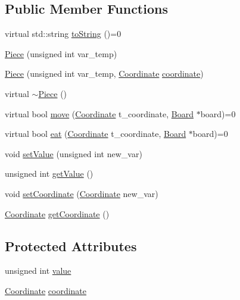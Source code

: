 \subsection*{Public Member Functions}
\begin{DoxyCompactItemize}
\item 
virtual std\+::string \hyperlink{class_piece_a2a017f933a49e17d9a60a665ee9df605}{to\+String} ()=0
\item 
\hyperlink{class_piece_afc89acd5b05abd2f8fa4f60ee7ca3b20}{Piece} (unsigned int var\+\_\+temp)
\item 
\hyperlink{class_piece_af1ce807c73a4b82abf28161ea07a95a2}{Piece} (unsigned int var\+\_\+temp, \hyperlink{class_coordinate}{Coordinate} \hyperlink{class_piece_a9e92373c8fffc1f5efb20d62204b70cf}{coordinate})
\item 
virtual \hyperlink{class_piece_a5d7a4f6bade94cb33b6f634de8aa7918}{$\sim$\+Piece} ()
\item 
virtual bool \hyperlink{class_piece_a4939b8f41018950374d294b256906ec3}{move} (\hyperlink{class_coordinate}{Coordinate} t\+\_\+coordinate, \hyperlink{class_board}{Board} $\ast$board)=0
\item 
virtual bool \hyperlink{class_piece_a94fffb0c34e637910c08ded95185e135}{eat} (\hyperlink{class_coordinate}{Coordinate} t\+\_\+coordinate, \hyperlink{class_board}{Board} $\ast$board)=0
\item 
void \hyperlink{class_piece_a889ea7d9eb4b691a07143e9084382b2a}{set\+Value} (unsigned int new\+\_\+var)
\item 
unsigned int \hyperlink{class_piece_a83cba58885b2a385c6b858c1df33de29}{get\+Value} ()
\item 
void \hyperlink{class_piece_aadf96b2e3cdf28dcc52f670f8bc4e0f5}{set\+Coordinate} (\hyperlink{class_coordinate}{Coordinate} new\+\_\+var)
\item 
\hyperlink{class_coordinate}{Coordinate} \hyperlink{class_piece_a847e09b148d9b7125ef9ef8f1d970862}{get\+Coordinate} ()
\end{DoxyCompactItemize}
\subsection*{Protected Attributes}
\begin{DoxyCompactItemize}
\item 
unsigned int \hyperlink{class_piece_a8933ca826f6c9b958f781eaa0160c2b7}{value}
\item 
\hyperlink{class_coordinate}{Coordinate} \hyperlink{class_piece_a9e92373c8fffc1f5efb20d62204b70cf}{coordinate}
\end{DoxyCompactItemize}


